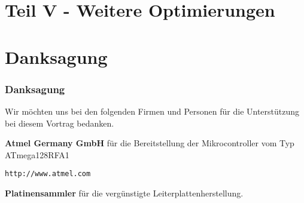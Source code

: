 \documentclass{beamer}
\begin{document}






\section{Teil V - Weitere Optimierungen}



\section{Danksagung}
\begin{frame}
\frametitle{Danksagung}

Wir möchten uns bei den folgenden Firmen und Personen
für die Unterstützung bei diesem Vortrag bedanken.

\vspace{0.3 cm}

\textbf{Atmel Germany GmbH}
für die Bereitstellung der Mikrocontroller vom Typ
ATmega128RFA1
\vspace{0.3 cm}

\texttt{http://www.atmel.com}

\vspace{0.3 cm}

\textbf{Platinensammler}
für die vergünstigte Leiterplattenherstellung.
\vspace{0.3 cm}

\end{frame}
\end{document}
